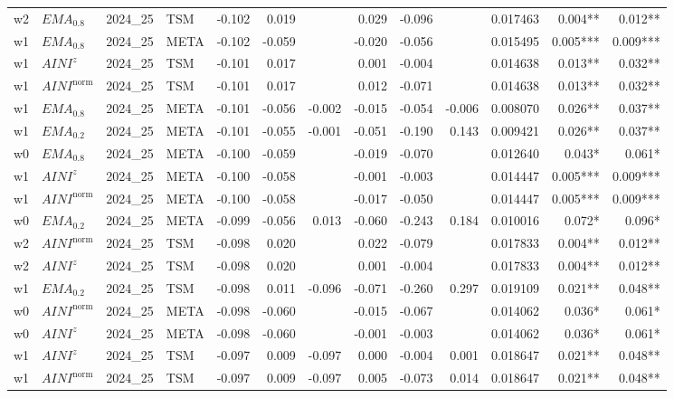\begin{longtable}{@{}llllrrrrrrrrr@{}}
w2 & $EMA_{0.8}$ & 2024\_25 & TSM & -0.102 & 0.019 &  & 0.029 & -0.096 &  & 0.017463 & 0.004** & 0.012** \\
w1 & $EMA_{0.8}$ & 2024\_25 & META & -0.102 & -0.059 &  & -0.020 & -0.056 &  & 0.015495 & 0.005*** & 0.009*** \\
w1 & $AINI^{z}$ & 2024\_25 & TSM & -0.101 & 0.017 &  & 0.001 & -0.004 &  & 0.014638 & 0.013** & 0.032** \\
w1 & $AINI^{\mathrm{norm}}$ & 2024\_25 & TSM & -0.101 & 0.017 &  & 0.012 & -0.071 &  & 0.014638 & 0.013** & 0.032** \\
w1 & $EMA_{0.8}$ & 2024\_25 & META & -0.101 & -0.056 & -0.002 & -0.015 & -0.054 & -0.006 & 0.008070 & 0.026** & 0.037** \\
w1 & $EMA_{0.2}$ & 2024\_25 & META & -0.101 & -0.055 & -0.001 & -0.051 & -0.190 & 0.143 & 0.009421 & 0.026** & 0.037** \\
w0 & $EMA_{0.8}$ & 2024\_25 & META & -0.100 & -0.059 &  & -0.019 & -0.070 &  & 0.012640 & 0.043* & 0.061* \\
w1 & $AINI^{z}$ & 2024\_25 & META & -0.100 & -0.058 &  & -0.001 & -0.003 &  & 0.014447 & 0.005*** & 0.009*** \\
w1 & $AINI^{\mathrm{norm}}$ & 2024\_25 & META & -0.100 & -0.058 &  & -0.017 & -0.050 &  & 0.014447 & 0.005*** & 0.009*** \\
w0 & $EMA_{0.2}$ & 2024\_25 & META & -0.099 & -0.056 & 0.013 & -0.060 & -0.243 & 0.184 & 0.010016 & 0.072* & 0.096* \\
w2 & $AINI^{\mathrm{norm}}$ & 2024\_25 & TSM & -0.098 & 0.020 &  & 0.022 & -0.079 &  & 0.017833 & 0.004** & 0.012** \\
w2 & $AINI^{z}$ & 2024\_25 & TSM & -0.098 & 0.020 &  & 0.001 & -0.004 &  & 0.017833 & 0.004** & 0.012** \\
w1 & $EMA_{0.2}$ & 2024\_25 & TSM & -0.098 & 0.011 & -0.096 & -0.071 & -0.260 & 0.297 & 0.019109 & 0.021** & 0.048** \\
w0 & $AINI^{\mathrm{norm}}$ & 2024\_25 & META & -0.098 & -0.060 &  & -0.015 & -0.067 &  & 0.014062 & 0.036* & 0.061* \\
w0 & $AINI^{z}$ & 2024\_25 & META & -0.098 & -0.060 &  & -0.001 & -0.003 &  & 0.014062 & 0.036* & 0.061* \\
w1 & $AINI^{z}$ & 2024\_25 & TSM & -0.097 & 0.009 & -0.097 & 0.000 & -0.004 & 0.001 & 0.018647 & 0.021** & 0.048** \\
w1 & $AINI^{\mathrm{norm}}$ & 2024\_25 & TSM & -0.097 & 0.009 & -0.097 & 0.005 & -0.073 & 0.014 & 0.018647 & 0.021** & 0.048** \\

\end{longtable}
